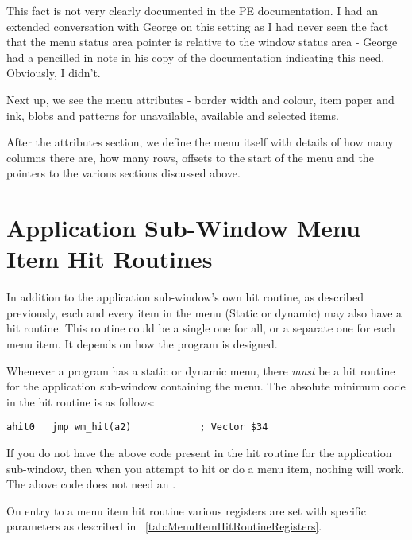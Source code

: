 \begin{note}
This fact is not very clearly documented in the PE documentation.
      I had an extended conversation with George on this setting as I had
      never seen the fact that the menu status area pointer is relative to the
      window status area -{} George had a pencilled in note in his copy of the
      documentation indicating this need. Obviously, I didn't.
\end{note}

Next up, we see the menu attributes -{} border width and colour, item
    paper and ink, blobs and patterns for unavailable, available and selected
    items.

After the attributes section, we define the menu itself with details
    of how many columns there are, how many rows, offsets to the start of the
    menu and the pointers to the various sections discussed above.

\section{Application Sub-{}Window Menu Item Hit Routines}
\label{ch29-app-menu-item-hit}%

In addition to the application sub-{}window's own hit routine, as
    described previously, each and every item in the menu (Static or dynamic)
    may also have a hit routine. This routine could be a single one for all,
    or a separate one for each menu item. It depends on how the program is
    designed.

\begin{note}
Whenever a program has a static or dynamic menu, there
 \emph{must} be a hit routine for the application
      sub-{}window containing the menu. The absolute minimum code in the hit
      routine is as follows:

\begin{lstlisting}[firstnumber=1,caption={AppMenuTest1Win\_asm - Application Window Hit Routine}]
ahit0   jmp wm_hit(a2)            ; Vector $34
\end{lstlisting}

If you do not have the above code present in the hit routine for
      the application sub-{}window, then when you attempt to hit or do a menu
      item, nothing will work. The above code does not need an .
\end{note}

On entry to a menu item hit routine various registers are set with
    specific parameters as described in \tablename~\ref{tab:MenuItemHitRoutineRegisters}.


